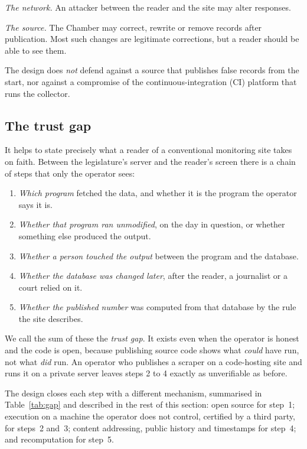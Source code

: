 \emph{The network.} An attacker between the reader and the site may alter responses.

\emph{The source.} The Chamber may correct, rewrite or remove records after publication. Most such changes are legitimate corrections, but a reader should be able to see them.

The design does \emph{not} defend against a source that publishes false records from the start, nor against a compromise of the continuous-integration (CI) platform that runs the collector.

\subsection{The trust gap}
\label{sec:gap}

It helps to state precisely what a reader of a conventional monitoring site takes on faith. Between the legislature's server and the reader's screen there is a chain of steps that only the operator sees:

\begin{enumerate}[leftmargin=1.6em,itemsep=1pt]
\item \emph{Which program} fetched the data, and whether it is the program the operator says it is.
\item \emph{Whether that program ran unmodified}, on the day in question, or whether something else produced the output.
\item \emph{Whether a person touched the output} between the program and the database.
\item \emph{Whether the database was changed later}, after the reader, a journalist or a court relied on it.
\item \emph{Whether the published number} was computed from that database by the rule the site describes.
\end{enumerate}

We call the sum of these the \emph{trust gap}. It exists even when the operator is honest and the code is open, because publishing source code shows what \emph{could} have run, not what \emph{did} run. An operator who publishes a scraper on a code-hosting site and runs it on a private server leaves steps 2 to 4 exactly as unverifiable as before.

The design closes each step with a different mechanism, summarised in Table~\ref{tab:gap} and described in the rest of this section: open source for step~1; execution on a machine the operator does not control, certified by a third party, for steps~2 and~3; content addressing, public history and timestamps for step~4; and recomputation for step~5.


